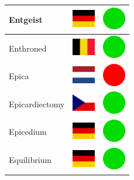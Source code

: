 \documentclass[12pt, a4paper, twoside]{report}
\begin{document}
\begin{center}
\begin{longtable}{|p{5cm}|p{2cm}|p{2cm}|}
 Entgeist                                                   & \includegraphics[width=1cm]{../4x3/de} &   \includegraphics[width=1cm]{../likes/y} \\ \hline
 Enthroned                                                  & \includegraphics[width=1cm]{../4x3/be} &   \includegraphics[width=1cm]{../likes/y} \\ \hline
 Epica                                                      & \includegraphics[width=1cm]{../4x3/nl} &   \includegraphics[width=1cm]{../likes/n} \\ \hline
 Epicardiectomy                                             & \includegraphics[width=1cm]{../4x3/cz} &   \includegraphics[width=1cm]{../likes/y} \\ \hline
 Epicedium                                                  & \includegraphics[width=1cm]{../4x3/de} &   \includegraphics[width=1cm]{../likes/y} \\ \hline
 Equilibrium                                                & \includegraphics[width=1cm]{../4x3/de} &   \includegraphics[width=1cm]{../likes/y} \\ \hline

\end{longtable}
\end{center}
\end{document}

